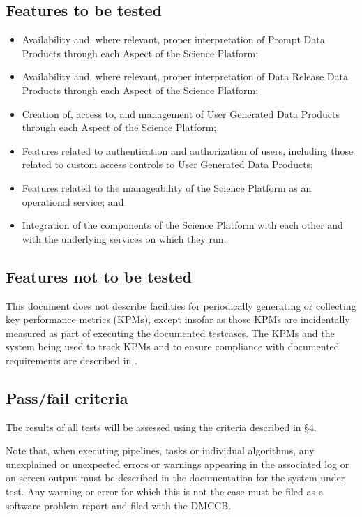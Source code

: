 \documentclass[DM,STS,toc]{lsstdoc}
\begin{document}
\subsection{Features to be tested}
\label{sec:feat2test}

\begin{itemize}

\item{Availability and, where relevant, proper interpretation of Prompt Data Products through each Aspect of the Science Platform;}
\item{Availability and, where relevant, proper interpretation of Data Release Data Products through each Aspect of the Science Platform;}
\item{Creation of, access to, and management of User Generated Data Products through each Aspect of the Science Platform;}
\item{Features related to authentication and authorization of users, including those related to custom access controls to User Generated Data Products;}
\item{Features related to the manageability of the Science Platform as an operational service; and}
\item{Integration of the components of the Science Platform with each other and with the underlying services on which they run.}

\end{itemize}

\subsection{Features not to be tested}
\label{sec:featnot2test}

This document does not describe facilities for periodically generating or collecting key performance metrics (KPMs), except insofar as those KPMs are incidentally measured as part of executing the documented testcases. 
The KPMs and the system being used to track KPMs and to ensure compliance with documented requirements are described in .

\subsection{Pass/fail criteria}
\label{sec:passfail}

The results of all tests will be assessed using the criteria described in  \S4.

Note that, when executing pipelines, tasks or individual algorithms, any unexplained or unexpected errors or warnings appearing in the associated log or on screen output must be described in the documentation for the system under test. 
Any warning or error for which this is not the case must be filed as a software problem report and filed with the DMCCB.
\end{document}
